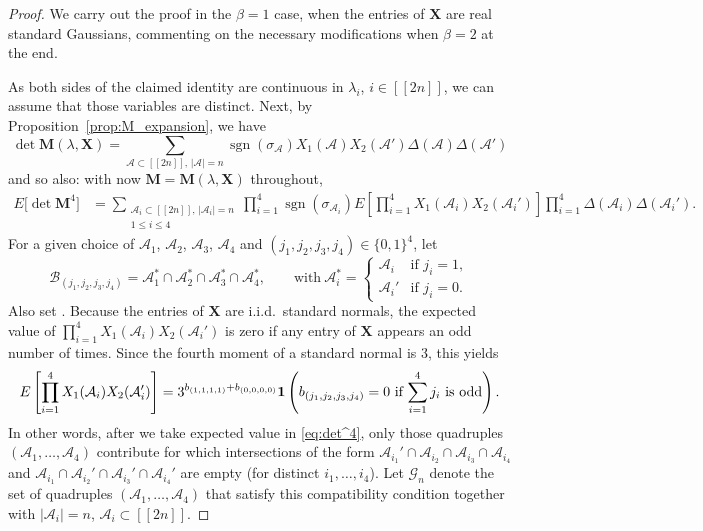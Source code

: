 \documentclass[pdftex]{sigma}
\numberwithin{equation}{section}
\theoremstyle{definition}
\newcommand{\ind}{{\bf{1}}}
\newcommand{\cB}{\mathcal{B}}
\newcommand{\sgn}{\operatorname{sgn}}
\newcommand{\cA}{\mathcal{A}}
\newcommand{\cG}{\mathcal{G}}
\newcommand{\lst}[1]{[\![#1 ]\!]}
\newcommand{\mbf}[1]{\mathbf{#1}}
\begin{document}
\begin{proof}
We carry out the proof in the $\beta=1$ case, when
the entries of $\mbf{X}$ are real standard Gaussians, commenting on the necessary modifications when $\beta =2$ at the end.

As both sides of the claimed identity are continuous in $\lambda_{i}$, $i\in \lst{2n}$, we can assume
that those variables are distinct. Next,
by Proposition~\ref{prop:M_expansion}, we have
\[
\det \mbf{M}({\lambda},\mbf{X})=\sum_{\cA\subset \lst{2n},\, |\cA|=n} \sgn(\sigma_{\cA}) X_1(\cA)X_2(\cA') \Delta(\cA)\Delta(\cA')
\]
and so also: with now $\mbf{M} = \mbf{M}(\lambda, \mbf{X})$ throughout,
\begin{align}\label{eq:det^4}
 E\big[ \det \mbf{M}^4\big]&=\sum_{\substack{\cA_i\subset \lst{2n}, \, |\cA_i|=n\\ 1\le i\le 4}} \prod_{i=1}^4 \sgn(\sigma_{\cA_i}) E \left [\prod_{i=1}^4 X_1(\cA_i) X_2(\cA_i') \right] \prod_{i=1}^4 \Delta(\cA_i)\Delta(\cA_i').
\end{align}
For a given choice of $\cA_1$, $\cA_2$, $\cA_3$, $\cA_4$ and $(j_1,j_2,j_3,j_4)\in \{0,1\}^4$, let
\begin{equation}
\cB_{(j_1,j_2,j_3,j_4)}=\cA_1^* \cap \cA_2^* \cap\cA_3^*\cap \cA_4^*, \qquad \text{with} \ \cA_i^*=\begin{cases}
 \cA_i& \text{if } j_i=1,\\
 \cA_i'& \text{if } j_i=0. \label{overlaps}
\end{cases}
\end{equation}
Also set \smash{$b_{(j_1,j_2,j_3,j_4)}=|\cB_{(j_1,j_2,j_3,j_4)}|$}.
Because the entries of $\mbf{X}$ are i.i.d.~standard normals, the expected value of $\prod_{i=1}^4 X_1(\cA_i) X_2(\cA_i')$ is zero if any entry of $\mbf{X}$ appears an odd number of times. Since the fourth moment of a standard normal is 3, this yields
\begin{align}\label{eq:det4_111}
 E\left[\prod_{i=1}^4 X_1(\cA_i) X_2(\cA_i')\right]=3^{b_{(1,1,1,1)}+b_{(0,0,0,0)}} \ind\left(b_{(j_1,j_2,j_3,j_4)}=0 \text{ if $\sum_{i=1}^4 j_i$ is odd}\right).
\end{align}
In other words, after we take expected value in \eqref{eq:det^4}, only those quadruples $(\cA_1,\dots, \cA_4)$ contribute for which intersections of the form $\cA_{i_1}'\cap \cA_{i_2}\cap \cA_{i_3} \cap\cA_{i_4}$ and $\cA_{i_1}\cap \cA_{i_2}' \cap\cA_{i_3}' \cap\cA_{i_4}'$ are empty (for distinct $i_1,\dots, i_4$).
Let $\cG_n$ denote the set of quadruples $(\cA_1,\dots, \cA_4)$ that satisfy this compatibility condition together with $|\cA_i|=n$, $\cA_i\subset \lst{2n}$.


\end{proof}
\end{document}
